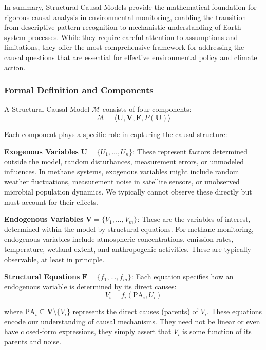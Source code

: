 In summary, Structural Causal Models provide the mathematical foundation for rigorous causal analysis in environmental monitoring, enabling the transition from descriptive pattern recognition to mechanistic understanding of Earth system processes. While they require careful attention to assumptions and limitations, they offer the most comprehensive framework for addressing the causal questions that are essential for effective environmental policy and climate action.

\subsubsection{Formal Definition and Components}

A Structural Causal Model $\mathcal{M}$ consists of four components:
\begin{equation}
	\mathcal{M} = \langle \mathbf{U}, \mathbf{V}, \mathbf{F}, P(\mathbf{U}) \rangle
\end{equation}

Each component plays a specific role in capturing the causal structure:

\textbf{Exogenous Variables} $\mathbf{U} = \{U_1, ..., U_n\}$: These represent factors determined outside the model, random disturbances, measurement errors, or unmodeled influences. In methane systems, exogenous variables might include random weather fluctuations, measurement noise in satellite sensors, or unobserved microbial population dynamics. We typically cannot observe these directly but must account for their effects.

\textbf{Endogenous Variables} $\mathbf{V} = \{V_1, ..., V_m\}$: These are the variables of interest, determined within the model by structural equations. For methane monitoring, endogenous variables include atmospheric concentrations, emission rates, temperature, wetland extent, and anthropogenic activities. These are typically observable, at least in principle.

\textbf{Structural Equations} $\mathbf{F} = \{f_1, ..., f_m\}$: Each equation specifies how an endogenous variable is determined by its direct causes:
\begin{equation}
	V_i = f_i(\text{PA}_i, U_i)
\end{equation}

where $\text{PA}_i \subseteq \mathbf{V} \setminus \{V_i\}$ represents the direct causes (parents) of $V_i$. These equations encode our understanding of causal mechanisms. They need not be linear or even have closed-form expressions, they simply assert that $V_i$ is some function of its parents and noise.

